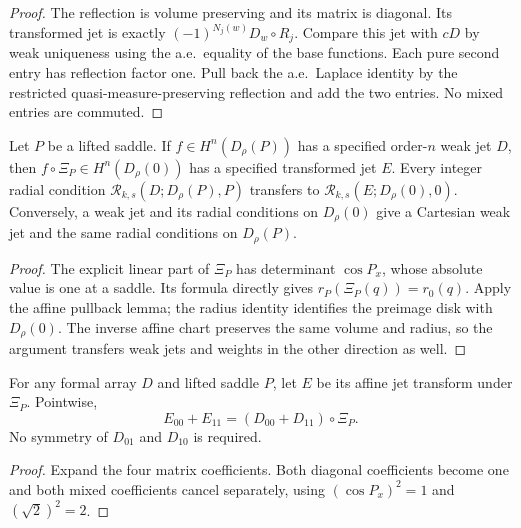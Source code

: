 \begin{proof}
\leanok
The reflection is volume preserving and its matrix is diagonal.
Its transformed jet is exactly $(-1)^{N_j(w)}D_w\circ R_j$.
Compare this jet with $cD$ by weak uniqueness using the a.e.\ equality of
the base functions. Each pure second entry has reflection factor one.
Pull back the a.e.\ Laplace identity by the restricted quasi-measure-preserving
reflection and add the two entries. No mixed entries are commuted.
\end{proof}

\begin{lemma}
\label{lem:saddle-chart-pullback}
\leanok
Let $P$ be a lifted saddle. If $f\in H^n(D_\rho(P))$ has a specified
order-$n$ weak jet $D$, then $f\circ\Xi_P\in H^n(D_\rho(0))$ has a
specified transformed jet $E$. Every integer radial condition
$\mathcal R_{k,s}(D;D_\rho(P),P)$ transfers to
$\mathcal R_{k,s}(E;D_\rho(0),0)$. Conversely, a weak jet and its radial
conditions on $D_\rho(0)$ give a Cartesian weak jet and the same radial
conditions on $D_\rho(P)$.
\end{lemma}

\begin{proof}
\leanok
The explicit linear part of $\Xi_P$ has determinant $\cos P_x$,
whose absolute value is one at a saddle.
Its formula directly gives $r_P(\Xi_P(q))=r_0(q)$.
Apply the affine pullback lemma; the radius identity identifies
the preimage disk with $D_\rho(0)$. The inverse affine chart preserves
the same volume and radius, so the argument transfers weak jets and
weights in the other direction as well.
\end{proof}

\begin{lemma}
\label{lem:saddle-chart-laplacian}
\leanok
For any formal array $D$ and lifted saddle $P$, let $E$ be its affine
jet transform under $\Xi_P$. Pointwise,
\[
 E_{00}+E_{11}=(D_{00}+D_{11})\circ\Xi_P.
\]
No symmetry of $D_{01}$ and $D_{10}$ is required.
\end{lemma}

\begin{proof}
\leanok
Expand the four matrix coefficients. Both diagonal coefficients become
one and both mixed coefficients cancel separately, using
$(\cos P_x)^2=1$ and $(\sqrt2)^2=2$.
\end{proof}

